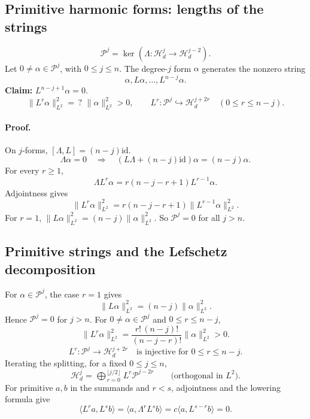 \documentclass[11pt]{article}
\newcommand{\Hd}{\mathcal H_d}
\newcommand{\Prim}{\mathcal P}
\newcommand{\id}{\mathrm{id}}
\begin{document}
\subsection*{Primitive harmonic forms: lengths of the strings}
\[
 \Prim^j=\ker(\Lambda:\Hd^j\longrightarrow\Hd^{j-2}).
\]
Let $0\neq\alpha\in\Prim^j$, with $0\leq j\leq n$.
The degree-$j$ form $\alpha$ generates the nonzero string
\[
 \alpha,L\alpha,\ldots,L^{n-j}\alpha.
\]
\textbf{Claim:} $L^{n-j+1}\alpha=0$.
\[
 \|L^r\alpha\|_{L^2}^2=\boxed{\,?\,}\,\|\alpha\|_{L^2}^2>0,
 \qquad
 L^r:\Prim^j\hookrightarrow\Hd^{j+2r}
 \quad(0\leq r\leq n-j).
\]
\paragraph{Proof.}
On $j$-forms, $[\Lambda,L]=(n-j)\id$.
\[
 \Lambda\alpha=0
 \quad\Longrightarrow\quad
 (L\Lambda+(n-j)\id)\alpha=(n-j)\alpha.
\]
For every $r\geq1$,
\[
 \Lambda L^r\alpha=r(n-j-r+1)L^{r-1}\alpha.
\]
Adjointness gives
\[
 \|L^r\alpha\|_{L^2}^2
 =r(n-j-r+1)\|L^{r-1}\alpha\|_{L^2}^2.
\]
For $r=1$, $\|L\alpha\|_{L^2}^2=(n-j)\|\alpha\|_{L^2}^2$.
So $\Prim^j=0$ for all $j>n$.

\subsection*{Primitive strings and the Lefschetz decomposition}
For $\alpha\in\Prim^j$, the case $r=1$ gives
\[
 \|L\alpha\|_{L^2}^2=(n-j)\|\alpha\|_{L^2}^2.
\]
Hence $\Prim^j=0$ for $j>n$.
For $0\neq\alpha\in\Prim^j$ and $0\leq r\leq n-j$,
\[
 \|L^r\alpha\|_{L^2}^2
 =\frac{r!\,(n-j)!}{(n-j-r)!}\|\alpha\|_{L^2}^2>0.
\]
\[
 L^r:\Prim^j\longrightarrow\Hd^{j+2r}
 \quad\text{is injective for }0\leq r\leq n-j.
\]
Iterating the splitting, for a fixed $0\leq j\leq n$,
\[
 \Hd^j=\mathop{\bigoplus\!{}^{\perp}}_{r=0}^{\lfloor j/2\rfloor}
 L^r\Prim^{j-2r}\qquad\text{(orthogonal in }L^2\text{)}.
\]
For primitive $a,b$ in the summands and $r<s$, adjointness and the
lowering formula give
\[
 \langle L^ra,L^sb\rangle
 =\langle a,\Lambda^rL^sb\rangle
 =c\langle a,L^{s-r}b\rangle=0.
\]

\end{document}
